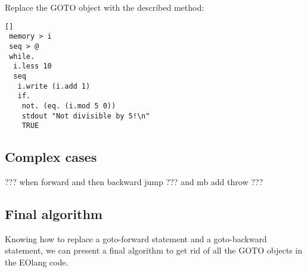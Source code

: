 \documentclass[two column]{article}
\begin{document}
Replace the GOTO object with the described method:
\begin{lstlisting}
[]
 memory > i
 seq > @
 while.
  i.less 10
  seq
   i.write (i.add 1)
   if.
    not. (eq. (i.mod 5 0))
    stdout "Not divisible by 5!\n"
    TRUE
\end{lstlisting}

\subsection{Complex cases}
??? when forward and then backward jump
??? and mb add throw ???


\subsection{Final algorithm}
Knowing how to replace a goto-forward statement and a goto-backward statement, we can present a final algorithm to get rid of all the GOTO objects in the EOlang code.
\end{document}
